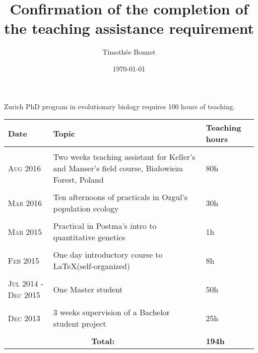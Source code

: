 \documentclass{scrartcl}
\title{Confirmation of the completion of the teaching assistance requirement}
\author{Timoth\'ee Bonnet}
\date{\today}
\begin{document}
\maketitle

Zurich PhD program in evolutionary biology requires 100 hours of teaching. 

\begin{tabular}{p{4cm} p{8cm} p{3cm}}
\toprule
\centering
\hfill Date & Topic & Teaching hours\\
\midrule
\multicolumn{2}{c}{} \\
\hfill \textsc{Aug 2016} & Two weeks teaching assistant for Keller's and Manser's field course, Bia{\l}owie$\dot{\mathrm{z}}$a Forest, Poland & 80h\\
\multicolumn{2}{c}{} \\
\hfill \textsc{Mar 2016} & Ten afternoons of practicals in Ozgul's population ecology & 30h\\
\multicolumn{2}{c}{} \\
\hfill \textsc{Mar 2015} & Practical in Postma's intro to quantitative genetics & 1h\\
\multicolumn{2}{c}{} \\
\hfill \textsc{Feb 2015} & One day introductory course to \LaTeX (self-organized) & 8h \\
\multicolumn{2}{c}{} \\
\hfill \textsc{Jul 2014 - Dec 2015} & One Master student & 50h\\
\multicolumn{2}{c}{} \\
\hfill \textsc{Dec 2013} & 3 weeks supervision of a Bachelor student project & 25h\\
\multicolumn{2}{c}{} \\
\midrule
\multicolumn{2}{c}{\hfill \textbf{Total:}}& \textbf{194h}\\
\bottomrule
\end{tabular}
\end{document}
